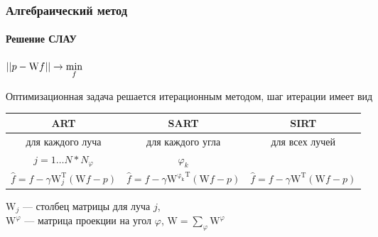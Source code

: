 \begin{frame}
\frametitle{Алгебраический метод}
\framesubtitle{Решение СЛАУ}
\centering
$\left|\left| p - \mathrm W f \right|\right| \rightarrow \min\limits_f$

Оптимизационная задача решается итерационным методом, шаг итерации имеет вид
\vspace{0.5cm}

\begingroup
\footnotesize

\hspace*{-0.5cm}
\begin{tabular}{c|c|c}
ART & SART & SIRT \\ \hline
для каждого луча & для каждого угла & для всех лучей\\
$j = 1 \dots N * N_\varphi$ & $\varphi_k$ & \\
$\hat{f} = f - \gamma \mathrm W^{\mathrm T}_j(\mathrm W f - p)$ &
$\hat{f} = f - \gamma \mathrm {W^{\varphi_k}}^{\mathrm T}(\mathrm W f - p)$ &
$\hat{f} = f - \gamma \mathrm W^{\mathrm T}(\mathrm W f - p)$ \\
\end{tabular}

\vspace{0.5cm}
\raggedright
\endgroup

$\mathrm W_j$ --- столбец матрицы для луча $j$,\\
$\mathrm W^\varphi$ ---  матрица проекции на угол $\varphi$, $\mathrm W = \sum_\varphi {\mathrm W^\varphi}$


\end{frame}